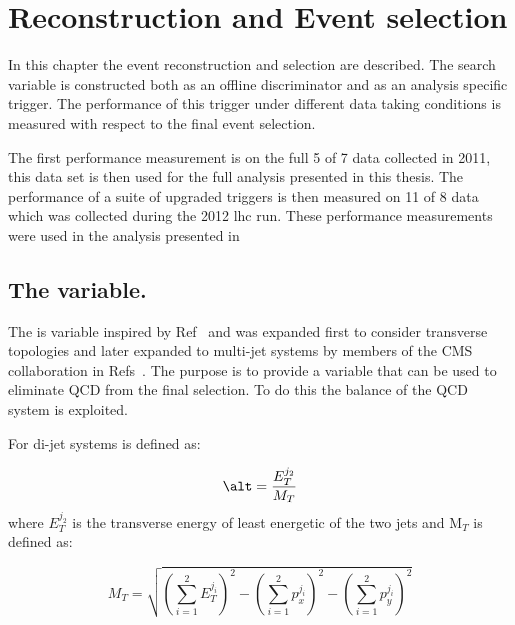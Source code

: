 \chapter{Reconstruction and Event selection} %
\label{cha:the_t_analysis}
In this chapter the event reconstruction and selection are described. The search variable \alt is constructed both as an offline discriminator and as an 
analysis specific trigger. The performance of this trigger under different data 
taking conditions is measured with respect to the final event selection.

The first performance measurement is on the full \unit{5}{\invfb} of 
\unit{7}{\TeV} data collected in 2011, this data set is then used for the full 
analysis presented in this thesis. The performance of a suite of upgraded \alt 
triggers is then measured on \unit{11}{\invfb} of \unit{8}{\TeV} data which was 
collected during the 2012 \ac{lhc} run. These performance measurements were 
used in the analysis presented in \cite{Chatrchyan:2012wa}


\section{The \alt variable.} %
\label{sec:the_alpha___t_variable_}
The \alt is variable inspired by Ref~\cite{Randall:2008dk} and was expanded first to consider transverse topologies and later expanded to  multi-jet systems by members of the CMS collaboration in 
Refs~\cite{cms-pas-sus-08005,cms-pas-sus-09001}. The purpose is to provide a 
variable that can be used to eliminate QCD from the final selection. To do 
this the balance of the QCD system is exploited.

For di-jet systems \alt is defined as:

\begin{equation}
  \alt = \frac{E_{T}^{j_{2}}}{M_{T}}
\end{equation}
where $E_{T}^{j_{2}}$ is the transverse energy of least energetic of the two 
jets and M$_{T}$ is defined as:

\begin{equation}
  M_{T} = \sqrt{\left(\sum^{2}_{i=1}E_{T}^{j_{i}}\right)^{2} - \left(\sum^{2}_{i=1}p_{x}^{j_{i}}\right)^{2} - \left(\sum^{2}_{i=1}p_{y}^{j_{i}}\right)^{2}}
\end{equation}

